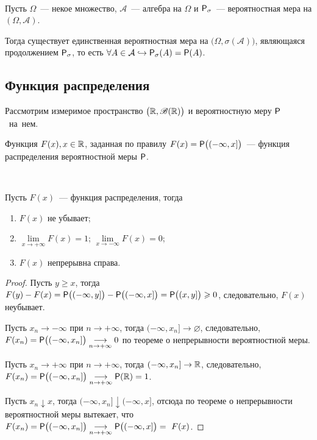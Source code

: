 \begin{theorem}[Каратеодори][б/д]~

	Пусть $\Omega$~--- некое множество, $\mathcal{A}$~--- алгебра на $\Omega$ и $\P_\sigma$~--- вероятностная мера на $(\Omega, \mathcal{A})$. 
	
	Тогда существует единственная вероятностная мера на $\big(\Omega, \sigma(\mathcal{A}) \big)$, являющаяся продолжением $\P_\sigma$, то есть  $ \forall A \in \mathcal{A} \hookrightarrow \P_\sigma(A) = \P(A)$.
\end{theorem}


\subsection{Функция распределения}

Рассмотрим измеримое пространство $\big(\R, \B(\R)\big)$ и вероятностную меру $\P$~на~нем.

\begin{definition}
	Функция $F(x), x \in \R$, заданная по правилу $F(x) = \P \big( (-\infty, x] \big)$~--- функция распределения вероятностной меры  $\P$.
\end{definition}

\begin{lemma}~

	Пусть $F(x)$~--- функция распределения, тогда
	\begin{enumerate}
		\item $F(x)$ не убывает;
		\item $\lim\limits_{x \rightarrow +\infty} F(x) = 1$; $\lim\limits_{x \rightarrow -\infty} F(x) = 0$;
		\item $F(x)$ непрерывна справа.
	\end{enumerate}
	\begin{proof}
		Пусть $y \geqslant x$, тогда $F(y) - F(x) = \P \big( (-\infty, y] \big) - \P \big( (-\infty, x] \big) = \P \big( (x, y] \big) \geqslant 0$, следовательно, $F(x)$ неубывает.
		
		Пусть $x_n \rightarrow -\infty$ при $n \rightarrow +\infty$, тогда $(-\infty, x_n] \rightarrow \varnothing$, следовательно, $F(x_n) = \P \big( (-\infty, x_n] \big) \underset{n \rightarrow +\infty}{\longrightarrow} 0$ по теореме о непрерывности вероятностной меры. 
		
		Пусть $x_n \rightarrow +\infty$ при $n \rightarrow +\infty$, тогда $(-\infty, x_n] \rightarrow \R$, следовательно, $F(x_n) = \P \big( (-\infty, x_n] \big) \underset{n \rightarrow +\infty}{\longrightarrow} \P(\R) = 1$.
				
		Пусть $x_n \downarrow x$, тогда $(-\infty, x_n] \downarrow (-\infty, x]$, отсюда по теореме о непрерывности вероятностной меры вытекает, что $F(x_n) = \P \big( (-\infty, x_n] \big) \underset{n \rightarrow +\infty}{\longrightarrow} \P \big( (-\infty, x] \big) =~F(x)$.
	\end{proof}
\end{lemma}

